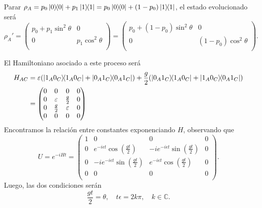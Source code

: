 \documentclass{scrartcl}
\DeclareRobustCommand{\[}{\begin{equation}}
\DeclareRobustCommand{\]}{\end{equation}}
\begin{document}
\begin{enumerate}
    Parar $\rho_A = p_0 \dyad{0}{0} + p_1 \dyad{1}{1} = p_0 \dyad{0}{0} + (1 - p_0) \dyad{1}{1}$, el estado evolucionado será
    \[
        \rho_A' =
        \begin{pmatrix}
            p_0 + p_1 \sin^2\theta & 0 \\
            0 & p_1 \cos^2\theta \\
        \end{pmatrix}
        =
        \begin{pmatrix}
            p_0 + (1 - p_0) \sin^2\theta & 0 \\
            0 & (1 - p_0) \cos^2\theta \\
        \end{pmatrix}.
    \]
    
    El Hamiltoniano asociado a este proceso será
    \begin{align}
        H_{AC} &= \varepsilon (\dyad{1_A 0_C}{1_A 0_C} + \dyad{0_A 1_C}{0_A 1_C} ) + \frac{g}{2} (\dyad{0_A 1_C}{1_A 0_C} + \dyad{1_A 0_C}{0_A 1_C}) \\
            &=
            \begin{pmatrix}
                0 & 0 & 0 & 0 \\
                0 & \varepsilon & \frac{g}{2} & 0 \\
                0 & \frac{g}{2} & \varepsilon & 0 \\
                0 & 0 & 0 & 0 \\
            \end{pmatrix}
    \end{align}
    Encontramos la relación entre constantes exponenciando $H$, observando que
    \[
        U = e^{-iH t} =
        \begin{pmatrix}
            1 & 0 & 0 & 0 \\
            0 & e^{-i \epsilon t} \cos(\frac{gt}{2}) & -ie^{-i \epsilon t} \sin(\frac{gt}{2}) & 0 \\
            0 & -ie^{-i \epsilon t} \sin(\frac{gt}{2}) & e^{-i \epsilon t} \cos(\frac{gt}{2}) & 0 \\
            0 & 0 & 0 & 0 \\
        \end{pmatrix}.
    \]
    Luego, las dos condiciones serán
    \[ \frac{gt}{2} = \theta, \quad t\epsilon = 2k\pi, \quad k \in \mathds{C}. \]
    
\end{enumerate}
\end{document}
